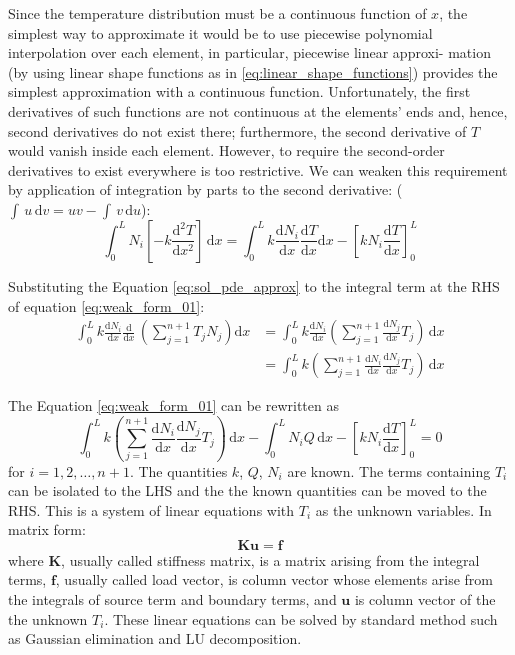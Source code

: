 \documentclass[a4paper,12pt]{article} %
\begin{document}
Since the temperature distribution must be a continuous function of $x$,
the simplest way to approximate it would be to use piecewise polynomial
interpolation over each element, in particular, piecewise linear approxi-
mation (by using linear shape functions as in \eqref{eq:linear_shape_functions})
provides the simplest approximation with a continuous function.
Unfortunately, the first derivatives of such functions are not continuous
at the elements' ends and, hence, second derivatives do not exist there;
furthermore, the second derivative of $T$ would vanish inside each element.
However, to require the second-order derivatives to exist everywhere is
too restrictive.
We can weaken this requirement by application of integration by parts to
the second derivative: ($\int\,u\,\mathrm{d}v = uv - \int\,v\,\mathrm{d}u$):
\begin{equation}
\int_{0}^{L} N_{i} \left[ -k\frac{\mathrm{d}^2 T}{\mathrm{d}x^2} \right]\,\mathrm{d}x =
\int_{0}^{L} k \frac{\mathrm{d} N_{i}}{\mathrm{d}x}
\frac{\mathrm{d} T}{\mathrm{d}x} \mathrm{d}x -
\left[ k N_{i} \frac{\mathrm{d}T}{\mathrm{d}x} \right]_{0}^{L}
\label{eq:weak_form_01}
\end{equation}

Substituting the Equation \eqref{eq:sol_pde_approx} to the integral
term at the RHS of equation \eqref{eq:weak_form_01}:
\begin{align}
\int_{0}^{L} k \frac{\mathrm{d} N_{i}}{\mathrm{d}x}
\frac{\mathrm{d}}{\mathrm{d}x}\, \left( \sum_{j=1}^{n+1} T_{j} N_{j} \right) \mathrm{d}x & =
\int_{0}^{L} k \frac{\mathrm{d} N_{i}}{\mathrm{d}x}
\left( \sum_{j=1}^{n+1} \frac{\mathrm{d}N_{j}}{\mathrm{d}x} T_{j} \right)\, \mathrm{d}x \\
& = \int_{0}^{L} k
\left( \sum_{j=1}^{n+1}
\frac{\mathrm{d} N_{i}}{\mathrm{d}x}
\frac{\mathrm{d}N_{j}}{\mathrm{d}x} T_{j} \right)\, \mathrm{d}x
\end{align}

The Equation \eqref{eq:weak_form_01} can be rewritten as
\begin{equation}
\int_{0}^{L} k
\left( \sum_{j=1}^{n+1}
\frac{\mathrm{d} N_{i}}{\mathrm{d}x}
\frac{\mathrm{d}N_{j}}{\mathrm{d}x} T_{j} \right)\, \mathrm{d}x -
\int_{0}^{L} N_{i} Q\, \mathrm{d}x -
\left[ k N_{i} \frac{\mathrm{d}T}{\mathrm{d}x} \right]_{0}^{L} = 0
\label{eq:weak_form_02}
\end{equation}
for $i=1,2,\ldots,n+1$. The quantities $k$, $Q$, $N_{i}$ are known.
The terms containing $T_{i}$ can be isolated to the LHS and the
the known quantities can be moved to the RHS. This is a system
of linear equations with $T_{i}$ as the unknown variables. In matrix form:
\begin{equation}
\mathbf{K} \mathbf{u} = \mathbf{f}
\label{eq:linear_system}
\end{equation}
where $\mathbf{K}$, usually called stiffness matrix,
is a matrix arising from the integral terms,
$\mathbf{f}$, usually called load vector, is
column vector whose elements arise from
the integrals of source term and boundary terms,
and $\mathbf{u}$ is column vector of the the unknown $T_{i}$.
These linear equations
can be solved by standard method such as Gaussian elimination and LU decomposition.
\end{document}
